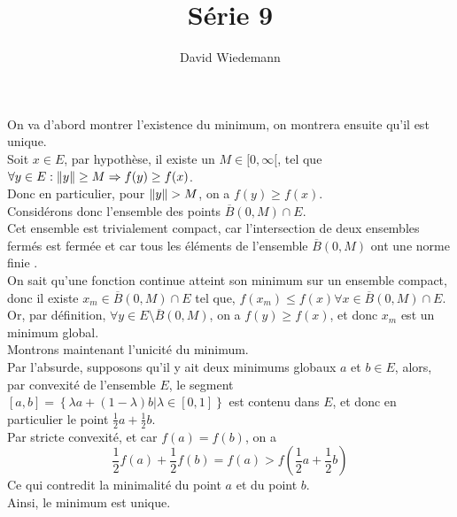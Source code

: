\documentclass[11pt, a4paper]{article}
\begin{document}
\title{Série 9}
\author{David Wiedemann}
\maketitle
On va d'abord montrer l'existence du minimum, on montrera ensuite qu'il est unique.\\
\hr
Soit $x \in E$, par hypothèse, il existe un $M \in [ 0, \infty [  $, tel que $\forall y \in E: \left\lVert y\right\rVert \geq M \Rightarrow f( y) \geq f( x) $.\\
Donc en particulier, pour $\left\lVert y\right\rVert > M$, on a $f( y) \geq f( x) $.\\
Considérons donc l'ensemble des points $ \overline{B}(0,M ) \cap E $.\\
Cet ensemble est trivialement  compact, car l'intersection de deux ensembles fermés est fermée et car tous les éléments de l'ensemble $\overline{B}( 0,M) $ ont une norme finie .\\
On sait qu'une fonction continue atteint son minimum sur un ensemble compact, donc il existe $x_m \in \overline{B}(0,M ) \cap E $ tel que, $f( x_m) \leq  f( x) \forall x  \in \overline{B}(0,M ) \cap E$.\\
Or, par définition, $\forall y \in E \setminus \overline{B}( 0,M) $, on a $ f( y) \geq f( x) $, et donc $x_m$ est un minimum global.\\
\hr
Montrons maintenant l'unicité du minimum.\\
Par l'absurde, supposons qu'il y ait deux minimums globaux $a$ et $b \in E$, alors, par convexité de l'ensemble $E$, le segment $[a,b]= \left\{ \lambda a + ( 1-\lambda) b | \lambda \in [ 0,1]  \right\} $	est contenu dans $E$, et donc en particulier le point $\frac{1}{2}a + \frac{1}{2}b$.\\
Par stricte convexité, et car $f( a) =f( b) $, on a 
\[ 
	\frac{1}{2}f( a) + \frac{1}{2}f( b) = f( a) > f( \frac{1}{2}a + \frac{1}{2}b) 
\]
Ce qui contredit la minimalité du point $a$ et du point $b$.\\
Ainsi, le minimum est unique.
\end{document}
